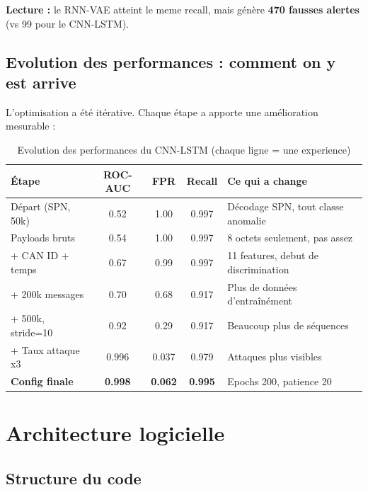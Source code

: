 \documentclass[12pt,a4paper]{article}
\begin{document}
\textbf{Lecture :} le RNN-VAE atteint le meme recall, mais génère \textbf{470 fausses alertes} (vs 99 pour le CNN-LSTM).

\subsection{Evolution des performances : comment on y est arrive}

L'optimisation a été itérative. Chaque étape a apporte une amélioration mesurable :

\begin{table}[H]
\centering
\small
\begin{tabular}{lcccp{5cm}}
\toprule
\textbf{Étape} & \textbf{ROC-AUC} & \textbf{FPR} & \textbf{Recall} & \textbf{Ce qui a change} \\
\midrule
Départ (SPN, 50k) & 0.52 & 1.00 & 0.997 & Décodage SPN, tout classe anomalie \\
Payloads bruts & 0.54 & 1.00 & 0.997 & 8 octets seulement, pas assez \\
+ CAN ID + temps & 0.67 & 0.99 & 0.997 & 11 features, debut de discrimination \\
+ 200k messages & 0.70 & 0.68 & 0.917 & Plus de données d'entraînément \\
+ 500k, stride=10 & 0.92 & 0.29 & 0.917 & Beaucoup plus de séquences \\
+ Taux attaque x3 & 0.996 & 0.037 & 0.979 & Attaques plus visibles \\
\textbf{Config finale} & \textbf{0.998} & \textbf{0.062} & \textbf{0.995} & Epochs 200, patience 20 \\
\bottomrule
\end{tabular}
\caption{Evolution des performances du CNN-LSTM (chaque ligne = une experience)}
\end{table}

\section{Architecture logicielle}

\subsection{Structure du code}
\end{document}

